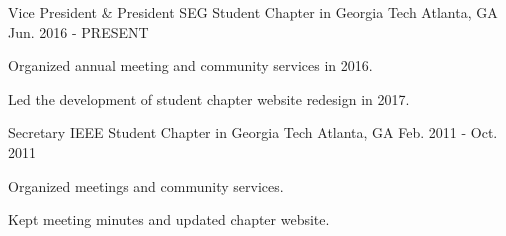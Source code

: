 

\begin{cventries}

  \cventry
    {Vice President \& President} %
    {SEG Student Chapter in Georgia Tech} %
    {Atlanta, GA} %
    {Jun. 2016 - PRESENT} %
    {
      \begin{cvitems} %
        \item {Organized annual meeting and community services in 2016.}
        \item {Led the development of student chapter website redesign in 2017.}
      \end{cvitems}
    }

  \cventry
    {Secretary} %
    {IEEE Student Chapter in Georgia Tech} %
    {Atlanta, GA} %
    {Feb. 2011 - Oct. 2011} %
    {
      \begin{cvitems} %
        \item {Organized meetings and community services.}
        \item {Kept meeting minutes and updated chapter website.}
      \end{cvitems}
    }
\end{cventries}
